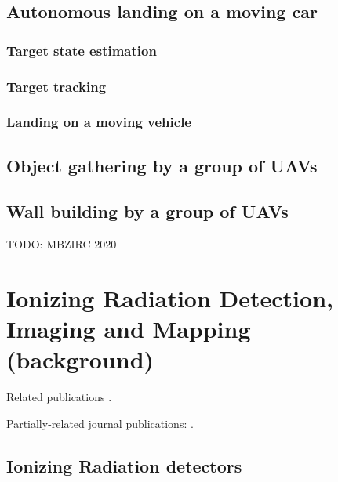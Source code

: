 \documentclass[a4paper,11pt,titlepage,twoside]{book}
\newcommand{\chapternoclear}[1]{
  \begingroup
  \let\cleardoublepage\clearpage
  \chapter{#1}
  \endgroup
}
\begin{document}
\section{Autonomous landing on a moving car}

\cite{baca2017autonomous, baca2019autonomous}

\subsection{Target state estimation}

\subsection{Target tracking}

\cite{baca2018model}

\subsection{Landing on a moving vehicle}

\section{Object gathering by a group of UAVs}

\cite{spurny2019cooperative}

\section{Wall building by a group of UAVs}

TODO: MBZIRC 2020



\chapternoclear{Ionizing Radiation Detection, Imaging and Mapping (background)}

Related publications \cite{baca2019timepix, baca2018rospix, stibinger2020localization}.

Partially-related journal publications: \cite{baca2016miniaturized, baca2018vzlusat}.


\section{Ionizing Radiation detectors}
\end{document}
